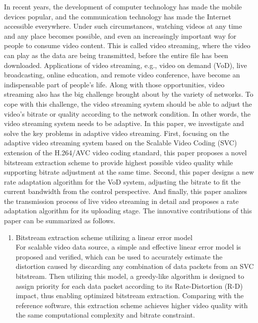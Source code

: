 \begin{eabstract}
In recent years, the development of computer technology has made the mobile devices popular, and the communication technology has made the Internet accessible everywhere. Under such circumstances, watching videos at any time and any place becomes possible, and even an increasingly important way for people to consume video content. This is called video streaming, where the video can play as the data are being transmitted, before the entire file has been downloaded. Applications of video streaming, e.g., video on demand (VoD), live broadcasting, online education, and remote video conference, have become an indispensable part of people's life. Along with those opportunities, video streaming also has the big challenge brought about by the variety of networks. To cope with this challenge, the video streaming system should be able to adjust the video's bitrate or quality according to the network condition. In other words, the video streaming system needs to be adaptive. In this paper, we investigate and solve the key problems in adaptive video streaming. First, focusing on the adaptive video streaming system based on the Scalable Video Coding (SVC) extension of the H.264/AVC video coding standard, this paper proposes a novel bitstream extraction scheme to provide highest possible video quality while supporting bitrate adjustment at the same time. Second, this paper designs a new rate adaptation algorithm for the VoD system, adjusting the bitrate to fit the current bandwidth from the control perspective. And finally, this paper analizes the transmission process of live video streaming in detail and proposes a rate adaptation algorithm for its uploading stage. The innovative contributions of this paper can be summarized as follows.
\begin{enumerate}
\item {Bitstream extraction scheme utilizing a linear error model}\\
For scalable video data source, a simple and effective linear error model is proposed and verified, which can be used to accurately estimate the distortion caused by discarding any combination of data packets from an SVC bitstream. Then utilizing this model, a greedy-like algorithm is designed to assign priority for each data packet according to its Rate-Distortion (R-D) impact, thus enabling optimized bitstream extraction. Comparing with the reference software, this extraction scheme achieves higher video quality with the same computational complexity and bitrate constraint.

\end{enumerate}
\end{eabstract}
